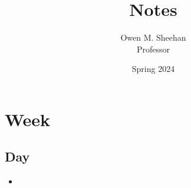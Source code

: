 \documentclass[12pt]{article}
\title{\class{} Notes}
\author{Owen M. Sheehan\\Professor \prof{}}
\date{Spring 2024}
\begin{document}
\maketitle
\tableofcontents
\newpage

    \section{Week}
        \subsection{Day}
        \bigskip
            \begin{itemize}
                \item 
            \end{itemize}
\end{document}

